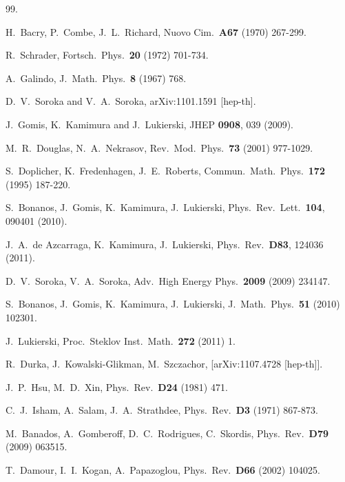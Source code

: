 \documentclass [prd,reprint,eqsecnum,nofootinbib]  {revtex4-1}
\begin{document}
\begin{thebibliography}{99.}

  H.~Bacry, P.~Combe, J.~L.~Richard,
  Nuovo Cim.\   {\bf A67 } (1970)  267-299.

  R.~Schrader,
  Fortsch.\ Phys.\   {\bf 20 } (1972)  701-734.

  A.~Galindo,
  J.~Math.\ Phys.\   {\bf 8 } (1967)  768.

  D.~V.~Soroka and V.~A.~Soroka,
  arXiv:1101.1591 [hep-th].

  J.~Gomis, K.~Kamimura and J.~Lukierski,
  JHEP {\bf 0908}, 039 (2009).

  M.~R.~Douglas, N.~A.~Nekrasov,
  Rev.\ Mod.\ Phys.\   {\bf 73 } (2001)  977-1029.

  S.~Doplicher, K.~Fredenhagen, J.~E.~Roberts,
  Commun.\ Math.\ Phys.\   {\bf 172 } (1995)  187-220.

  S.~Bonanos, J.~Gomis, K.~Kamimura, J.~Lukierski,
  Phys.\ Rev.\ Lett.\   {\bf 104}, 090401 (2010).

  J.~A.~de Azcarraga, K.~Kamimura, J.~Lukierski,
  Phys.\ Rev.\   {\bf D83}, 124036 (2011).

  D.~V.~Soroka, V.~A.~Soroka,
  Adv.\ High Energy Phys.\   {\bf 2009 } (2009)  234147.

  S.~Bonanos, J.~Gomis, K.~Kamimura, J.~Lukierski,
  J.\ Math.\ Phys.\   {\bf 51 } (2010)  102301.

  J.~Lukierski,
  Proc.\ Steklov Inst.\ Math.\   {\bf 272} (2011) 1.

  R.~Durka, J.~Kowalski-Glikman, M.~Szczachor,
  [arXiv:1107.4728 [hep-th]].

  J.~P.~Hsu, M.~D.~Xin,
  Phys.\ Rev.\   {\bf D24 } (1981)  471.

  C.~J.~Isham, A.~Salam, J.~A.~Strathdee,
  Phys.\ Rev.\   {\bf D3 } (1971)  867-873.

  M.~Banados, A.~Gomberoff, D.~C.~Rodrigues, C.~Skordis,
  Phys.\ Rev.\   {\bf D79 } (2009)  063515.

  T.~Damour, I.~I.~Kogan, A.~Papazoglou,
  Phys.\ Rev.\   {\bf D66 } (2002)  104025.


\end{thebibliography}
\end{document}

